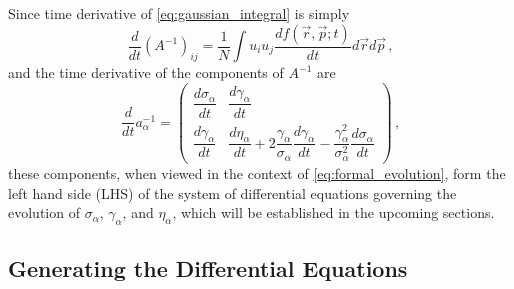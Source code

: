 Since time derivative of \ref{eq:gaussian_integral} is simply
\begin{equation} \label{eq:gaussian_integral_dt}
  \frac{d}{dt}(A^{-1})_{ij} = \frac{1}{N} \int u_i u_j \frac{df(\vec{r}, \vec{p}; t)}{dt} d\vec{r} d\vec{p} \,\text{,}
\end{equation}
and the time derivative of the components of $A^{-1}$ are
\begin{equation} \label{eq:dainvdt}
  \frac{d}{dt} a^{-1}_{\alpha} = 
  \begin{pmatrix}
    \dfrac{d\sigma_{\alpha}}{dt} & \dfrac{d\gamma_{\alpha}}{dt} \\
    \dfrac{d\gamma_{\alpha}}{dt} & \dfrac{d\eta_{\alpha}}{dt} + 2\dfrac{\gamma_{\alpha}}{\sigma_{\alpha}}\dfrac{d\gamma_{\alpha}}{dt}- \dfrac{\gamma^{2}_{\alpha}}{\sigma^{2}_{\alpha}}\dfrac{d\sigma_{\alpha}}{dt}
  \end{pmatrix} \,\text{,}
\end{equation}
these components, when viewed in the context of \ref{eq:formal_evolution}, form the left hand side (LHS) of the system of differential equations governing the evolution of $\sigma_{\alpha}$, $\gamma_{\alpha}$, and $\eta_{\alpha}$, which will be established in the upcoming sections.

\subsection{Generating the Differential Equations}

